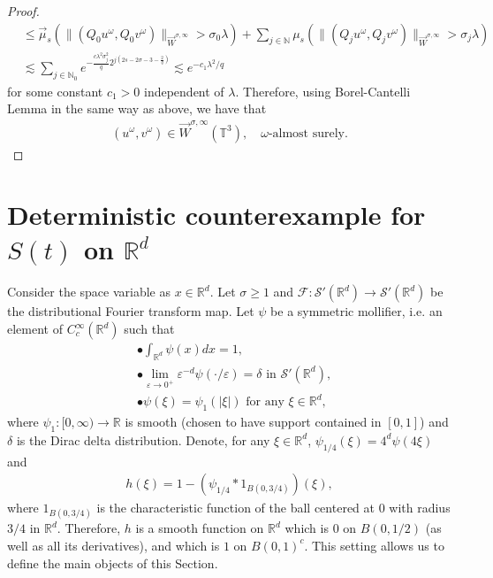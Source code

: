 \documentclass[a4paper, reqno, 11pt]{amsart}
\theoremstyle{definition}
\begin{document}
\begin{proof}
\begin{align*}
&\leq \vec{\mu}_s(\| (Q_0 u^{\omega},Q_0v^{\omega}) \|_{\vec{W}^{\sigma,\infty}} > \sigma_0 \lambda) + \sum_{j \in \mathbb{N}} \mu_s(\| (Q_j u^{\omega},Q_jv^{\omega}) \|_{\vec{W}^{\sigma,\infty}} > \sigma_j \lambda) \\
&\lesssim \sum_{j \in \mathbb{N}_0} e^{-\frac{c\lambda^2\sigma_j^2}{q} 2^{j(2s - 2 \sigma - 3 - \frac{2}{q})}} \lesssim e^{-c_1\lambda^2/q}
\end{align*}
for some constant $c_1 > 0$ independent of $\lambda$. Therefore, using Borel-Cantelli Lemma in the same way as above, we have that 
\begin{align*}
(u^{\omega},v^{\omega}) \in \vec{W}^{\sigma,\infty}(\mathbb{T}^3), \quad \omega\text{-almost surely}.
\end{align*}
\end{proof}


\section{Deterministic counterexample for $S(t)$ on $\mathbb{R}^d$}\label{sec:linearcex}	


Consider the space variable as $x \in \mathbb{R}^d$. Let $\sigma \geq 1$ and  $\mathcal{F} : \mathcal{S}'(\mathbb{R}^d) \rightarrow \mathcal{S}'(\mathbb{R}^d)$ be the distributional Fourier transform map. Let $\psi$ be a symmetric mollifier, i.e. an element of $C^{\infty}_c(\mathbb{R}^d)$ such that
\begin{align*}
&\bullet \int_{\mathbb{R}^d}\psi(x)dx = 1, \\
&\bullet \lim_{\varepsilon \rightarrow 0^+} \varepsilon^{-d} \psi(\cdot/\varepsilon) = \delta \text{ in } \mathcal{S}'(\mathbb{R}^d), \\
&\bullet \psi(\xi) = \psi_1(|\xi|) \text{ for any } \xi \in \mathbb{R}^d,
\end{align*}
where $\psi_1 : [0,\infty) \rightarrow \mathbb{R}$ is smooth (chosen to have support contained in $[0,1]$) and $\delta$ is the Dirac delta distribution. Denote, for any $\xi \in \mathbb{R}^d$, $\psi_{1/4}(\xi) = 4^d \psi(4 \xi)$ and
\begin{align}\label{eq:def-h}
h(\xi) = 1 - (\psi_{1/4} \ast \mathrm1_{B(0,3/4)})(\xi),
\end{align}
where $\mathrm1_{B(0,3/4)}$ is the characteristic function of the ball centered at $0$ with radius $3/4$ in $\mathbb{R}^d$. Therefore, $h$ is a smooth function on $\mathbb{R}^d$ which is $0$ on $B(0,1/2)$ (as well as all its derivatives), and which is $1$ on $B(0,1)^c$. This setting allows us to define the main objects of this Section.
\end{document}
